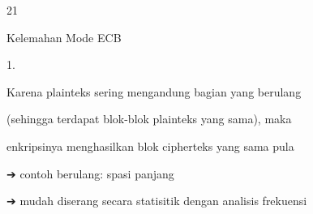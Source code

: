 \documentclass{article}
\begin{document}

21

Kelemahan Mode ECB

1.

Karena plainteks sering mengandung bagian yang  berulang 

(sehingga terdapat blok-blok plainteks yang sama), maka 

enkripsinya menghasilkan blok cipherteks yang sama pula


➔ contoh berulang: spasi panjang

       ➔ mudah diserang secara statisitik dengan analisis frekuensi
\end{document}
